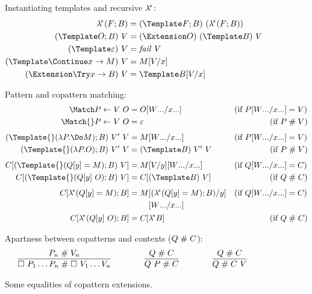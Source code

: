 \documentclass[runningheads]{llncs}
\begin{document}
\begin{figure}
Instantiating templates and recursive $\lambda^{\!*}$:
\begin{align*}
  \lamstar (F; B)
  &=
  (\Template F; B) ~ (\lamstar (F; B))
  \\
  (\Template O; B) ~ V
  &=
  (\Extension O) ~ (\Template B) ~ V
  \\
  (\Template \varepsilon) ~ V
  &=
  \mathit{fail}~V
  \\
  (\Template \Continue x \to M) ~ V
  &=
  M\subst{x}{V}
  \\
  (\Extension \Try x \to B) ~ V
  &=
  \Template B\subst{x}{V}
\end{align*}

Pattern and copattern matching:
\begin{align*}
  \Match P \gets V ~ O
  &=
  O\subst{\many{x}}{\many{W}}
  &(\text{if } P\subst{\many{x}}{\many{W}} &= V)
  \\
  \Match{} P \gets V ~ O
  &=
  \varepsilon
  &(\text{if } P &\apart V)
  \\[1ex]
  (\Template{} (\lambda P. \Do M); B) ~ V' ~ V
  &=
  M\subst{\many{x}}{\many{W}}
  &(\text{if } P\subst{\many{x}}{\many{W}} &= V)
  \\
  (\Template{} (\lambda P. O); B) ~ V' ~ V
  &=
  (\Template B) ~ V' ~ V
  &(\text{if } P &\apart V)
  \\[1ex]
  C[(\Template{} (Q[y] = M); B) ~ V]
  &=
  M\subst{y}{V}\subst{\many{x}}{\many{W}}
  &(\text{if } Q\subst{\many{x}}{\many{W}} &= C)
  \\
  C[(\Template{} (Q[y] ~ O); B) ~ V]
  &=
  C[(\Template B) ~ V]
  &(\text{if } Q &\apart C)
  \\[1ex]
  C[\lamstar (Q[y] = M); B]
  &=
  \begin{aligned}[t]
    M
    &\subst{y}{(\lamstar (Q[y] = M); B)}
    \\
    &\subst{\many{x}}{\many{W}}
  \end{aligned}
  &(\text{if } Q\subst{\many{x}}{\many{W}} &= C)
  \\
  C[\lamstar (Q[y] ~ O); B]
  &=
  C[\lamstar B]
  &(\text{if } Q &\apart C)
\end{align*}

Apartness between copatterns and contexts ($Q \mathrel{\#} C$):
\begin{gather*}
  \infer
  {\hole ~ P_1 \dots P_n \apart \hole ~ V_1 \dots V_n}
  {P_n \apart V_n}
  \qqqquad
  \infer
  {Q ~ P \apart C}
  {Q \apart C}
  \qqqquad
  \infer
  {Q \apart C ~ V}
  {Q \apart C}
\end{gather*}

\caption{Some equalities of copattern extensions.}
\label{fig:source-equality}
\end{figure}
\end{document}
